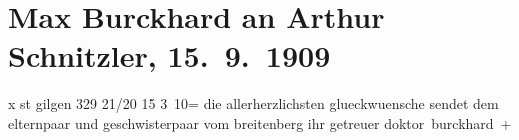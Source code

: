

         
         \renewcommand{\erwaehntePersonen}{Personen: Olga Schnitzler, Heinrich Schnitzler, Lili Schnitzler}
         \renewcommand{\erwaehnteOrte}{Orte: Breitenberg, St. Gilgen, Wien}
         \renewcommand{\erwaehnteWerke}{}
               \section[Max Burckhard an Arthur Schnitzler, 15. 9. 1909]{ Max Burckhard an Arthur Schnitzler, 15. 9. 1909}\nopagebreak{}\rehead{ }\begin{ledgroupsized}[t]{13cm}\normalsize\beginnumbering \toendnotes[C]{\smallbreak\pagebreak[2]} 
\toendnotes[C]{\smallbreak}\pstart
           {\pb}x st gilgen 329 21/20 15{ }3 10=\pend
           \pstart
           die allerherzlichsten glueckwuensche sendet dem elternpaar und geschwisterpaar vom breitenberg ihr getreuer \spacefill\mbox{doktor burckhard +}\pend
           
         
         \endnumbering{}\end{ledgroupsized}  \newcommand{\dateiname}{L01875}\newcommand{\titel}{Max Burckhard an Arthur Schnitzler, 15. 9. 1909}\newcommand{\editorInnen}{Martin Anton Müller und Gerd-Hermann Susen}
      